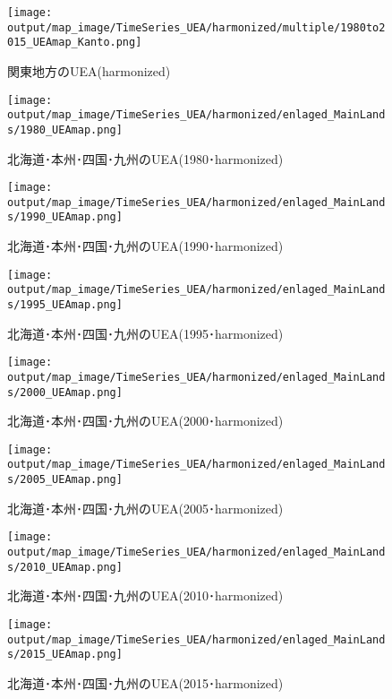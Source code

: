 \documentclass{ltjsarticle}
\begin{document}
\begin{figure}[pbth]
  \centering
  \texttt{[image: output/map\_image/TimeSeries\_UEA/harmonized/multiple/1980to2015\_UEAmap\_Kanto.png]}
  \caption{\label{ham:tsUEA:kan}関東地方のUEA(harmonized)}
\end{figure}

\begin{figure}[pbth]
  \centering
  \texttt{[image: output/map\_image/TimeSeries\_UEA/harmonized/enlaged\_MainLands/1980\_UEAmap.png]}
  \caption{\label{ham:1980UEA:enl}北海道･本州･四国･九州のUEA(1980･harmonized)}
\end{figure}
\begin{figure}[pbth]
  \centering
  \texttt{[image: output/map\_image/TimeSeries\_UEA/harmonized/enlaged\_MainLands/1990\_UEAmap.png]}
  \caption{\label{ham:1990UEA:enl}北海道･本州･四国･九州のUEA(1990･harmonized)}
\end{figure}
\begin{figure}[pbth]
  \centering
  \texttt{[image: output/map\_image/TimeSeries\_UEA/harmonized/enlaged\_MainLands/1995\_UEAmap.png]}
  \caption{\label{ham:1995UEA:enl}北海道･本州･四国･九州のUEA(1995･harmonized)}
\end{figure}
\begin{figure}[pbth]
  \centering
  \texttt{[image: output/map\_image/TimeSeries\_UEA/harmonized/enlaged\_MainLands/2000\_UEAmap.png]}
  \caption{\label{ham:2000UEA:enl}北海道･本州･四国･九州のUEA(2000･harmonized)}
\end{figure}
\begin{figure}[pbth]
  \centering
  \texttt{[image: output/map\_image/TimeSeries\_UEA/harmonized/enlaged\_MainLands/2005\_UEAmap.png]}
  \caption{\label{ham:2005UEA:enl}北海道･本州･四国･九州のUEA(2005･harmonized)}
\end{figure}
\begin{figure}[pbth]
  \centering
  \texttt{[image: output/map\_image/TimeSeries\_UEA/harmonized/enlaged\_MainLands/2010\_UEAmap.png]}
  \caption{\label{ham:2010UEA:enl}北海道･本州･四国･九州のUEA(2010･harmonized)}
\end{figure}
\begin{figure}[pbth]
  \centering
  \texttt{[image: output/map\_image/TimeSeries\_UEA/harmonized/enlaged\_MainLands/2015\_UEAmap.png]}
  \caption{\label{ham:2015UEA:enl}北海道･本州･四国･九州のUEA(2015･harmonized)}
\end{figure}
\end{document}
